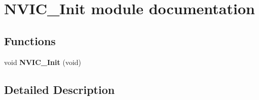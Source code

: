 \hypertarget{group___n_v_i_c___init__module}{}\section{N\+V\+I\+C\+\_\+\+Init module documentation}
\label{group___n_v_i_c___init__module}
\subsection*{Functions}
\begin{DoxyCompactItemize}
\item 
void {\bfseries N\+V\+I\+C\+\_\+\+Init} (void)\hypertarget{group___n_v_i_c___init__module_ga03530b0450999a80f9217a523cf7892c}{}\label{group___n_v_i_c___init__module_ga03530b0450999a80f9217a523cf7892c}

\end{DoxyCompactItemize}


\subsection{Detailed Description}
